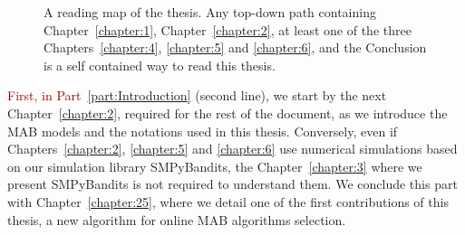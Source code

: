 \begin{figure}[h!]
{
    }
    \caption[Organization of the thesis: a reading map.]{A reading map of the thesis. Any top-down path containing Chapter~\ref{chapter:1}, Chapter~\ref{chapter:2}, at least one of the three Chapters~\ref{chapter:4}, \ref{chapter:5} and \ref{chapter:6}, and the Conclusion is a self contained way to read this thesis.}
    \label{fig:1:organization}
\end{figure}

\textcolor{darkred}{First, in Part~\ref{part:Introduction}} (second line), we start by the next Chapter~\ref{chapter:2}, required for the rest of the document, as we introduce the MAB models and the notations used in this thesis.
Conversely, even if Chapters~\ref{chapter:2}, \ref{chapter:5} and \ref{chapter:6} use numerical simulations based on our simulation library SMPyBandits, the Chapter~\ref{chapter:3} where we present SMPyBandits is not required to understand them.
We conclude this part with Chapter~\ref{chapter:25}, where we detail one of the first contributions of this thesis, a new algorithm for online MAB algorithms selection.

